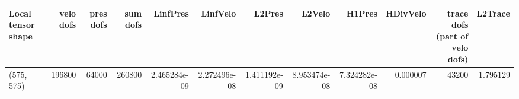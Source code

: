 \begin{tabular}{lrrrrrrrrrrr}
\toprule
Local tensor shape &  velo dofs &  pres dofs &  sum dofs &     LinfPres &     LinfVelo &       L2Pres &       L2Velo &       H1Pres &  HDivVelo &  trace dofs (part of velo dofs) &  L2Trace \\
\midrule
        (575, 575) &     196800 &      64000 &    260800 & 2.465284e-09 & 2.272496e-08 & 1.411192e-09 & 8.953474e-08 & 7.324282e-08 &  0.000007 &                           43200 & 1.795129 \\
\bottomrule
\end{tabular}
